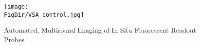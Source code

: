   \begin{figure}
    \centerline{\texttt{[image: \\FigDir/VSA\_control.jpg]}}
   \caption{Automated, Multiround Imaging of In Situ Fluorescent Readout Probes}
   \label{fig:VSA_control}
  \end{figure}



